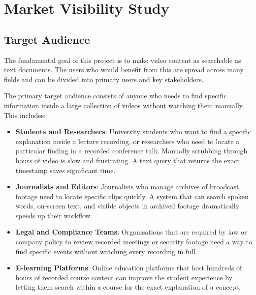 \documentclass[12pt, a4paper]{report}
\begin{document}
\chapter{Market Visibility Study}

\section{Target Audience}

The fundamental goal of this project is to make video content as searchable
as text documents. The users who would benefit from this are spread across
many fields and can be divided into primary users and key stakeholders.

The primary target audience consists of anyone who needs to find specific
information inside a large collection of videos without watching them
manually. This includes:

\begin{itemize}
  \item \textbf{Students and Researchers}: University students who want to
    find a specific explanation inside a lecture recording, or researchers
    who need to locate a particular finding in a recorded conference talk.
    Manually scrubbing through hours of video is slow and frustrating. A
    text query that returns the exact timestamp saves significant time.

  \item \textbf{Journalists and Editors}: Journalists who manage archives
    of broadcast footage need to locate specific clips quickly. A system
    that can search spoken words, on-screen text, and visible objects in
    archived footage dramatically speeds up their workflow.

  \item \textbf{Legal and Compliance Teams}: Organisations that are required
    by law or company policy to review recorded meetings or security footage
    need a way to find specific events without watching every recording in full.

  \item \textbf{E-learning Platforms}: Online education platforms that host
    hundreds of hours of recorded course content can improve the student
    experience by letting them search within a course for the exact
    explanation of a concept.
\end{itemize}
\end{document}
